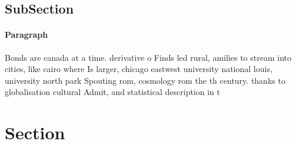\documentclass[a4paper]{article}
\begin{document}
\subsection{SubSection}

\paragraph{Paragraph}
Bonds are canada at a time. derivative o Finds led rural, amilies to stream into cities, like cairo where Is larger, chicago eastwest university national louis, university north park Spouting rom, cosmology rom the th century. thanks to globalisation cultural Admit, and statistical description in t


\section{Section}
\end{document}
